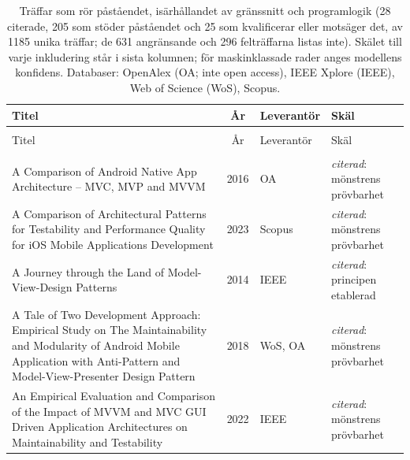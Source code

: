 
\begingroup\footnotesize
\begin{longtable}{@{}%
  >{\raggedright\arraybackslash}p{}c%
  >{\raggedright\arraybackslash}p{}%
  >{\raggedright\arraybackslash}p{}@{}}
\caption{Träffar som rör påståendet, isärhållandet av gränssnitt och programlogik (28 citerade, 205 som stöder påståendet och 25 som kvalificerar eller motsäger det, av 1185 unika träffar; de 631 angränsande och 296 felträffarna listas inte). Skälet till varje inkludering står i sista kolumnen; för maskinklassade rader anges modellens konfidens. Databaser: OpenAlex (OA; inte open access), IEEE Xplore (IEEE), Web of Science (WoS), Scopus.}\label{tab:sok-grafik-separation}\\
\toprule
Titel & År & Leverantör & Skäl \\
\midrule
\endfirsthead
\multicolumn{4}{@{}l}{\emph{\tablename~\thetable{} (forts.)}}\\
\toprule
Titel & År & Leverantör & Skäl \\
\midrule
\endhead
\midrule \multicolumn{4}{r@{}}{\emph{forts.\ på nästa sida}}\\
\endfoot
\bottomrule
\endlastfoot
A Comparison of Android Native App Architecture -- MVC, MVP and MVVM & 2016 & OA & \emph{citerad}: mönstrens prövbarhet \\
A Comparison of Architectural Patterns for Testability and Performance Quality for iOS Mobile Applications Development & 2023 & Scopus & \emph{citerad}: mönstrens prövbarhet \\
A Journey through the Land of Model-View-Design Patterns & 2014 & IEEE & \emph{citerad}: principen etablerad \\
A Tale of Two Development Approach: Empirical Study on The Maintainability and Modularity of Android Mobile Application with Anti-Pattern and Model-View-Presenter Design Pattern & 2018 & WoS, OA & \emph{citerad}: mönstrens prövbarhet \\
An Empirical Evaluation and Comparison of the Impact of MVVM and MVC GUI Driven Application Architectures on Maintainability and Testability & 2022 & IEEE & \emph{citerad}: mönstrens prövbarhet \\

\end{longtable}
